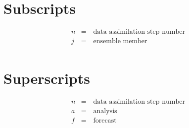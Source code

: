 \documentclass[10pt,twoside]{article}
\begin{document}
\section{Subscripts}
\vskip -0.2in

\begin{align*}
n    & = \quad \text{data assimilation step number}\\
j    & = \quad \text{ensemble member}\\
\end{align*}

\section{Superscripts}



\vskip -0.2in

\begin{align*}
n  & = \quad \text{data assimilation step number}\\
a  & = \quad \text{analysis} \\
f  & = \quad \text{forecast}
\end{align*}

\vskip -0.2in




\vskip 0.2in
\end{document}
